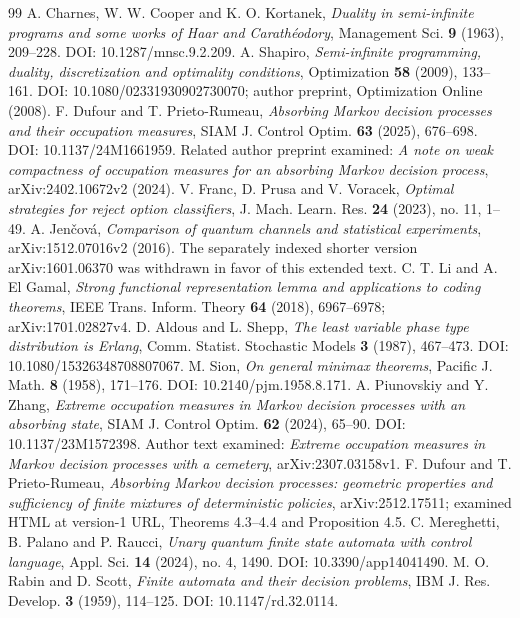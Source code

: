 \begin{thebibliography}{99}
 A. Charnes, W. W. Cooper and K. O. Kortanek, \emph{Duality in semi-infinite programs and some works of Haar and Carath\'eodory}, Management Sci. \textbf{9} (1963), 209--228. DOI: 10.1287/mnsc.9.2.209.
 A. Shapiro, \emph{Semi-infinite programming, duality, discretization and optimality conditions}, Optimization \textbf{58} (2009), 133--161. DOI: 10.1080/02331930902730070; author preprint, Optimization Online (2008).
 F. Dufour and T. Prieto-Rumeau, \emph{Absorbing Markov decision processes and their occupation measures}, SIAM J. Control Optim. \textbf{63} (2025), 676--698. DOI: 10.1137/24M1661959. Related author preprint examined: \emph{A note on weak compactness of occupation measures for an absorbing Markov decision process}, arXiv:2402.10672v2 (2024).
 V. Franc, D. Prusa and V. Voracek, \emph{Optimal strategies for reject option classifiers}, J. Mach. Learn. Res. \textbf{24} (2023), no. 11, 1--49.
 A. Jen\v{c}ov\'a, \emph{Comparison of quantum channels and statistical experiments}, arXiv:1512.07016v2 (2016). The separately indexed shorter version arXiv:1601.06370 was withdrawn in favor of this extended text.
 C. T. Li and A. El Gamal, \emph{Strong functional representation lemma and applications to coding theorems}, IEEE Trans. Inform. Theory \textbf{64} (2018), 6967--6978; arXiv:1701.02827v4.
 D. Aldous and L. Shepp, \emph{The least variable phase type distribution is Erlang}, Comm. Statist. Stochastic Models \textbf{3} (1987), 467--473. DOI: 10.1080/15326348708807067.
 M. Sion, \emph{On general minimax theorems}, Pacific J. Math. \textbf{8} (1958), 171--176. DOI: 10.2140/pjm.1958.8.171.
 A. Piunovskiy and Y. Zhang, \emph{Extreme occupation measures in Markov decision processes with an absorbing state}, SIAM J. Control Optim. \textbf{62} (2024), 65--90. DOI: 10.1137/23M1572398. Author text examined: \emph{Extreme occupation measures in Markov decision processes with a cemetery}, arXiv:2307.03158v1.
 F. Dufour and T. Prieto-Rumeau, \emph{Absorbing Markov decision processes: geometric properties and sufficiency of finite mixtures of deterministic policies}, arXiv:2512.17511; examined HTML at version-1 URL, Theorems 4.3--4.4 and Proposition 4.5.
 C. Mereghetti, B. Palano and P. Raucci, \emph{Unary quantum finite state automata with control language}, Appl. Sci. \textbf{14} (2024), no. 4, 1490. DOI: 10.3390/app14041490.
 M. O. Rabin and D. Scott, \emph{Finite automata and their decision problems}, IBM J. Res. Develop. \textbf{3} (1959), 114--125. DOI: 10.1147/rd.32.0114.

\end{thebibliography}
